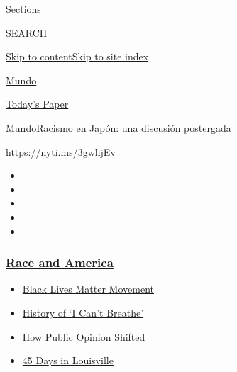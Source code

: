 Sections

SEARCH

\protect\hyperlink{site-content}{Skip to
content}\protect\hyperlink{site-index}{Skip to site index}

\href{https://www.nytimes3xbfgragh.onion/es/section/mundo}{Mundo}

\href{https://myaccount.nytimes3xbfgragh.onion/auth/login?response_type=cookie\&client_id=vi}{}

\href{https://www.nytimes3xbfgragh.onion/section/todayspaper}{Today's
Paper}

\href{/es/section/mundo}{Mundo}\textbar{}Racismo en Japón: una discusión
postergada

\url{https://nyti.ms/3gwhjEv}

\begin{itemize}
\item
\item
\item
\item
\item
\end{itemize}

\hypertarget{race-and-america}{%
\subsubsection{\texorpdfstring{\href{https://www.nytimes3xbfgragh.onion/news-event/george-floyd-protests-minneapolis-new-york-los-angeles?name=styln-george-floyd\&region=TOP_BANNER\&variant=undefined\&block=storyline_menu_recirc\&action=click\&pgtype=Article\&impression_id=d8a7e2b0-e3ad-11ea-81b0-ed0ce085a510}{Race
and America}}{Race and America}}\label{race-and-america}}

\begin{itemize}
\tightlist
\item
  \href{https://www.nytimes3xbfgragh.onion/interactive/2020/07/03/us/george-floyd-protests-crowd-size.html?name=styln-george-floyd\&region=TOP_BANNER\&variant=undefined\&block=storyline_menu_recirc\&action=click\&pgtype=Article\&impression_id=d8a7e2b1-e3ad-11ea-81b0-ed0ce085a510}{Black
  Lives Matter Movement}
\item
  \href{https://www.nytimes3xbfgragh.onion/interactive/2020/06/28/us/i-cant-breathe-police-arrest.html?name=styln-george-floyd\&region=TOP_BANNER\&variant=undefined\&block=storyline_menu_recirc\&action=click\&pgtype=Article\&impression_id=d8a7e2b2-e3ad-11ea-81b0-ed0ce085a510}{History
  of `I Can't Breathe'}
\item
  \href{https://www.nytimes3xbfgragh.onion/interactive/2020/06/10/upshot/black-lives-matter-attitudes.html?name=styln-george-floyd\&region=TOP_BANNER\&variant=undefined\&block=storyline_menu_recirc\&action=click\&pgtype=Article\&impression_id=d8a7e2b3-e3ad-11ea-81b0-ed0ce085a510}{How
  Public Opinion Shifted}
\item
  \href{https://www.nytimes3xbfgragh.onion/interactive/2020/07/16/us/black-lives-matter-protests-louisville-breonna-taylor.html?name=styln-george-floyd\&region=TOP_BANNER\&variant=undefined\&block=storyline_menu_recirc\&action=click\&pgtype=Article\&impression_id=d8a7e2b4-e3ad-11ea-81b0-ed0ce085a510}{45
  Days in Louisville}
\end{itemize}


